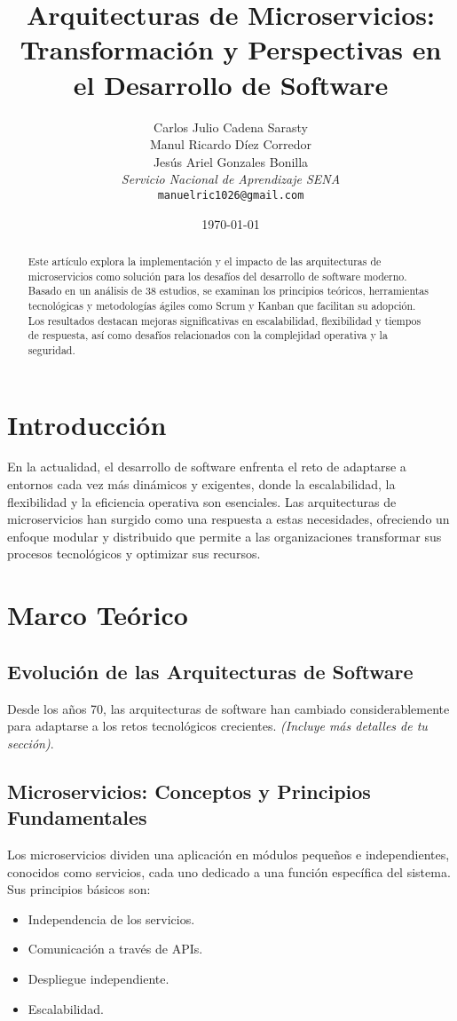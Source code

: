 \documentclass[12pt]{article}
\title{Arquitecturas de Microservicios: Transformación y Perspectivas en el Desarrollo de Software}
\author{
Carlos Julio Cadena Sarasty\\
Manul Ricardo Díez Corredor\\
Jesús Ariel Gonzales Bonilla\\
\textit{Servicio Nacional de Aprendizaje SENA}\\
\texttt{manuelric1026@gmail.com}
}
\date{\today}
\begin{document}
\maketitle

\begin{abstract}
Este artículo explora la implementación y el impacto de las arquitecturas de microservicios como solución para los desafíos del desarrollo de software moderno. Basado en un análisis de 38 estudios, se examinan los principios teóricos, herramientas tecnológicas y metodologías ágiles como Scrum y Kanban que facilitan su adopción. Los resultados destacan mejoras significativas en escalabilidad, flexibilidad y tiempos de respuesta, así como desafíos relacionados con la complejidad operativa y la seguridad.
\end{abstract}

\section{Introducción}
En la actualidad, el desarrollo de software enfrenta el reto de adaptarse a entornos cada vez más dinámicos y exigentes, donde la escalabilidad, la flexibilidad y la eficiencia operativa son esenciales. Las arquitecturas de microservicios han surgido como una respuesta a estas necesidades, ofreciendo un enfoque modular y distribuido que permite a las organizaciones transformar sus procesos tecnológicos y optimizar sus recursos.

\section{Marco Teórico}
\subsection{Evolución de las Arquitecturas de Software}
Desde los años 70, las arquitecturas de software han cambiado considerablemente para adaptarse a los retos tecnológicos crecientes. \textit{(Incluye más detalles de tu sección)}.

\subsection{Microservicios: Conceptos y Principios Fundamentales}
Los microservicios dividen una aplicación en módulos pequeños e independientes, conocidos como servicios, cada uno dedicado a una función específica del sistema. Sus principios básicos son:
\begin{itemize}
    \item Independencia de los servicios.
    \item Comunicación a través de APIs.
    \item Despliegue independiente.
    \item Escalabilidad.
\end{itemize}
\end{document}
